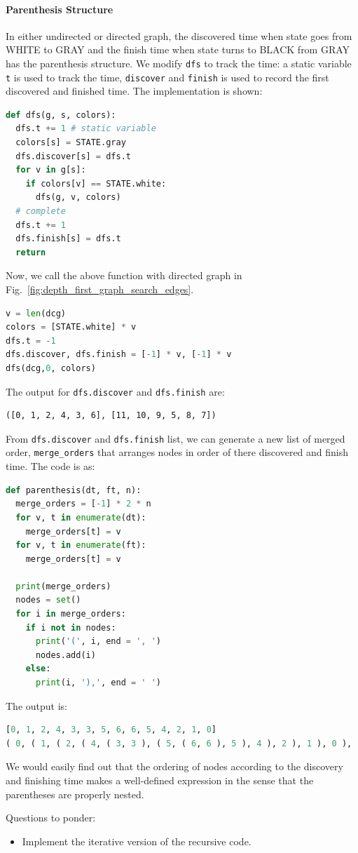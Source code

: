 \documentclass[../main.tex]{subfiles}
\begin{document}
\paragraph{Parenthesis Structure} In either undirected or directed graph, the discovered time when state goes from WHITE to GRAY and the finish time  when state turns to BLACK from GRAY has the parenthesis structure. We modify \texttt{dfs} to track the time:  a static variable \texttt{t} is used to track the time, \texttt{discover} and \texttt{finish} is used to record the first discovered and finished time. The implementation is shown:
\begin{lstlisting}[language=Python]
def dfs(g, s, colors):
  dfs.t += 1 # static variable
  colors[s] = STATE.gray
  dfs.discover[s] = dfs.t
  for v in g[s]:
    if colors[v] == STATE.white:
      dfs(g, v, colors)
  # complete
  dfs.t += 1
  dfs.finish[s] = dfs.t
  return
\end{lstlisting}
Now, we call the above function with directed graph in Fig.~\ref{fig:depth_first_graph_search_edges}.
\begin{lstlisting}[language=Python]
v = len(dcg)
colors = [STATE.white] * v
dfs.t = -1
dfs.discover, dfs.finish = [-1] * v, [-1] * v
dfs(dcg,0, colors)
\end{lstlisting}
The output for \texttt{dfs.discover} and \texttt{dfs.finish} are:
\begin{lstlisting}[numbers=none]
([0, 1, 2, 4, 3, 6], [11, 10, 9, 5, 8, 7])
\end{lstlisting}
From \texttt{dfs.discover} and \texttt{dfs.finish} list, we can generate a new list of merged order, \texttt{merge\_orders} that arranges nodes in order of there discovered and finish time. The code is as:
\begin{lstlisting}[language=Python]
def parenthesis(dt, ft, n):
  merge_orders = [-1] * 2 * n
  for v, t in enumerate(dt):
    merge_orders[t] = v
  for v, t in enumerate(ft):
    merge_orders[t] = v

  print(merge_orders)
  nodes = set()
  for i in merge_orders:
    if i not in nodes:
      print('(', i, end = ', ')
      nodes.add(i)
    else:
      print(i, '),', end = ' ')
\end{lstlisting}
The output is:
\begin{lstlisting}[language=Python]
[0, 1, 2, 4, 3, 3, 5, 6, 6, 5, 4, 2, 1, 0]
( 0, ( 1, ( 2, ( 4, ( 3, 3 ), ( 5, ( 6, 6 ), 5 ), 4 ), 2 ), 1 ), 0 ), 
\end{lstlisting}
We would easily find out that the ordering of nodes according to the discovery and finishing time makes a well-defined expression in the sense that the parentheses are properly nested.
\begin{bclogo}[couleur = blue!30, arrondi=0.1,logo=\bccrayon,ombre=true]{Questions to ponder: } 
\begin{itemize}
\item Implement the iterative version of the recursive code.
\end{itemize}
\end{bclogo}
\end{document}
